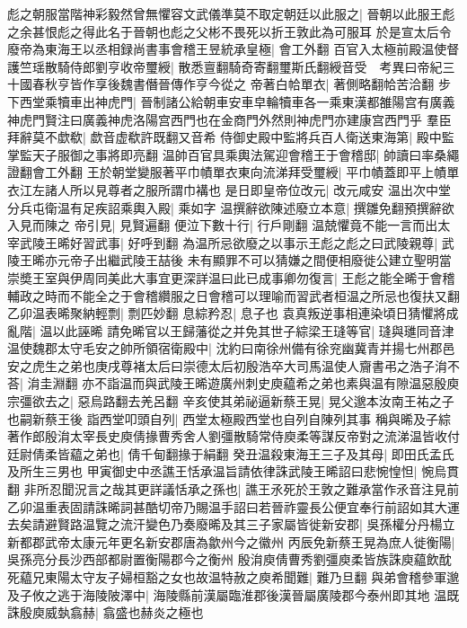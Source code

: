 彪之朝服當階神彩毅然曾無懼容文武儀準莫不取定朝廷以此服之|{
	晉朝以此服王彪之余甚恨彪之得此名于晉朝也彪之父彬不畏死以折王敦此為可服耳}
於是宣太后令廢帝為東海王以丞相録尚書事會稽王昱統承皇極|{
	會工外翻}
百官入太極前殿温使督護竺瑶散騎侍郎劉亨收帝璽綬|{
	散悉亶翻騎奇寄翻璽斯氏翻綬音受　考異曰帝紀三十國春秋亨皆作享後魏書僭晉傳作亨今從之}
帝著白帢單衣|{
	著側略翻帢苦洽翻}
步下西堂乘犢車出神虎門|{
	晉制諸公給朝車安車皁輪犢車各一乘東漢都雒陽宫有廣義神虎門賢注曰廣義神虎洛陽宫西門也在金商門外然則神虎門亦建康宫西門乎}
羣臣拜辭莫不歔欷|{
	歔音虚欷許既翻又音希}
侍御史殿中監將兵百人衛送東海第|{
	殿中監掌監天子服御之事將即亮翻}
温帥百官具乘輿法駕迎會稽王于會稽邸|{
	帥讀曰率桑繩證翻會工外翻}
王於朝堂變服著平巾幘單衣東向流涕拜受璽綬|{
	平巾幘蓋即平上幘單衣江左諸人所以見尊者之服所謂巾褠也}
是日即皇帝位改元|{
	改元咸安}
温出次中堂分兵屯衛温有足疾詔乘輿入殿|{
	乘如字}
温撰辭欲陳述廢立本意|{
	撰雛免翻預撰辭欲入見而陳之}
帝引見|{
	見賢遍翻}
便泣下數十行|{
	行戶剛翻}
温兢懼竟不能一言而出太宰武陵王晞好習武事|{
	好呼到翻}
為温所忌欲廢之以事示王彪之彪之曰武陵親尊|{
	武陵王晞亦元帝子出繼武陵王喆後}
未有顯罪不可以猜嫌之間便相廢徙公建立聖明當崇奬王室與伊周同美此大事宜更深詳温曰此已成事卿勿復言|{
	王彪之能全晞于會稽輔政之時而不能全之于會稽纘服之日會稽可以理喻而習武者桓温之所忌也復扶又翻}
乙卯温表晞聚納輕剽|{
	剽匹妙翻}
息綜矜忍|{
	息子也}
袁真叛逆事相連染頃日猜懼將成亂階|{
	温以此誣晞}
請免晞官以王歸藩從之并免其世子綜梁王㻱等官|{
	㻱與璡同音津}
温使魏郡太守毛安之帥所領宿衛殿中|{
	沈約曰南徐州備有徐兖幽冀青并揚七州郡邑}
安之虎生之弟也庚戌尊褚太后曰崇德太后初殷浩卒大司馬温使人齎書弔之浩子㳙不荅|{
	㳙圭淵翻}
亦不詣温而與武陵王晞遊廣州刺史庾藴希之弟也素與温有隙温惡殷庾宗彊欲去之|{
	惡烏路翻去羌呂翻}
辛亥使其弟祕逼新蔡王晃|{
	晃父邈本汝南王祐之子也嗣新蔡王後}
詣西堂叩頭自列|{
	西堂太極殿西堂也自列自陳列其事}
稱與晞及子綜著作郎殷㳙太宰長史庾倩掾曹秀舍人劉彊散騎常侍庾柔等謀反帝對之流涕温皆收付廷尉倩柔皆藴之弟也|{
	倩千甸翻掾于絹翻}
癸丑温殺東海王三子及其母|{
	即田氏孟氏及所生三男也}
甲寅御史中丞譙王恬承温旨請依律誅武陵王晞詔曰悲惋惶怛|{
	惋烏貫翻}
非所忍聞況言之哉其更詳議恬承之孫也|{
	譙王氶死於王敦之難承當作氶音注見前}
乙卯温重表固請誅晞詞甚酷切帝乃賜温手詔曰若晉祚靈長公便宜奉行前詔如其大運去矣請避賢路温覽之流汗變色乃奏廢晞及其三子家屬皆徙新安郡|{
	吳孫權分丹楊立新都郡武帝太康元年更名新安郡唐為歙州今之徽州}
丙辰免新蔡王晃為庶人徙衡陽|{
	吳孫亮分長沙西部都尉置衡陽郡今之衡州}
殷㳙庾倩曹秀劉彊庾柔皆族誅庾藴飲酖死藴兄東陽太守友子婦桓豁之女也故温特赦之庾希聞難|{
	難乃旦翻}
與弟會稽參軍邈及子攸之逃于海陵陂澤中|{
	海陵縣前漢屬臨淮郡後漢晉屬廣陵郡今泰州即其地}
温既誅殷庾威埶翕赫|{
	翕盛也赫炎之極也}

